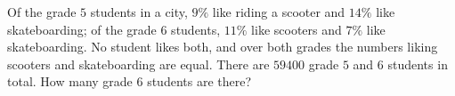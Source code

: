 Of the grade $5$ students in a city, $9\%$ like riding a scooter and $14\%$ like skateboarding; of the grade $6$ students, $11\%$ like scooters and $7\%$ like skateboarding. No student likes both, and over both grades the numbers liking scooters and skateboarding are equal. There are $59400$ grade $5$ and $6$ students in total. How many grade $6$ students are there?
